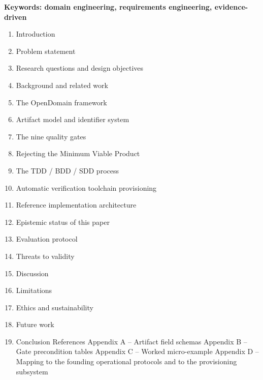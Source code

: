 \documentclass[11pt,a4paper]{article}
\begin{document}
\begin{abstract}
reference implementation architecture in which all gate evaluation is a pure function of a version-controlled workspace, and define an evaluation protocol comprising four studies: a longitudinal case study, a controlled comparison against specification-first development, a falsification-oriented survey of constructed domain artefacts, and a mechanised audit of epistemic-state transitions. We report the framework design, the gate semantics, the artifact model, and the protocol. We do not report results; Section 12 states what remains unvalidated.
\end{abstract}

\noindent\textbf{Keywords: domain engineering, requirements engineering, evidence-driven}

\tableofcontents
\vspace{1em}
\begin{enumerate}[leftmargin=*,nosep,topsep=2pt]
\item Introduction
\item Problem statement
\item Research questions and design objectives
\item Background and related work
\item The OpenDomain framework
\item Artifact model and identifier system
\item The nine quality gates
\item Rejecting the Minimum Viable Product
\item The TDD / BDD / SDD process
\item Automatic verification toolchain provisioning
\item Reference implementation architecture
\item Epistemic status of this paper
\item Evaluation protocol
\item Threats to validity
\item Discussion
\item Limitations
\item Ethics and sustainability
\item Future work
\item Conclusion    References    Appendix A -- Artifact field schemas    Appendix B -- Gate precondition tables    Appendix C -- Worked micro-example    Appendix D -- Mapping to the founding operational protocols and to the                   provisioning subsystem
\end{enumerate}
\end{document}
